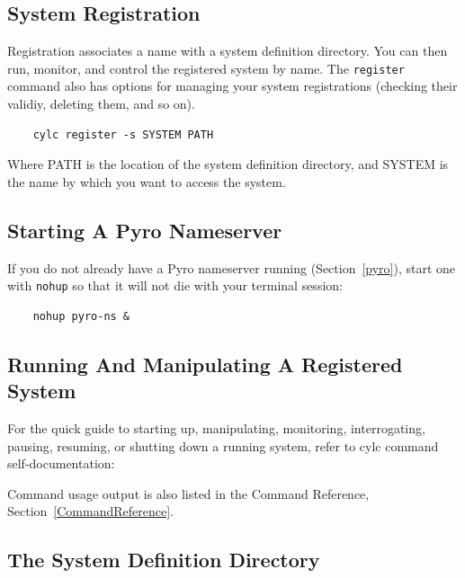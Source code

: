 \documentclass[11pt,a4paper]{article}
\begin{document}
\subsection{System Registration}

Registration associates a name with a system definition directory. You
can then run, monitor, and control the registered system by name. The
\lstinline=register= command also has options for managing your system
registrations (checking their validiy, deleting them, and so on).

\begin{lstlisting}
    cylc register -s SYSTEM PATH
\end{lstlisting}

Where PATH is the location of the system definition directory, and SYSTEM
is the name by which you want to access the system. 

\subsection{Starting A Pyro Nameserver}

If you do not already have a Pyro nameserver running
(Section~\ref{pyro}), start one with \lstinline{nohup} so that it will
not die with your terminal session: 

\begin{lstlisting}
    nohup pyro-ns &
\end{lstlisting}

\subsection{Running And Manipulating A Registered System}

For the quick guide to starting up, manipulating, monitoring,
interrogating, pausing, resuming, or shutting down a running system,
refer to cylc command self-documentation:

    
Command usage output is also listed in the Command Reference,
Section~\ref{CommandReference}.

\pagebreak
\subsection{The System Definition Directory} 
\label{TheSystemDefinitionDirectory}
\end{document}
